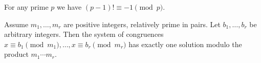 \begin{theorem}
    For any prime $p$ we have
    $(p - 1)! \equiv -1 \pmod{p}$.
\end{theorem}

\begin{theorem}
    Assume $m_1, \dots, m_r$ are positive integers, relatively prime in pairs.
    Let $b_1, \dots, b_r$ be arbitrary integers.
    Then the system of congruences
    $x \equiv b_1 \pmod{m_1}, \dots, x \equiv b_r \pmod{m_r}$
    has exactly one solution modulo the product $m_1 \cdots m_r$.
\end{theorem}